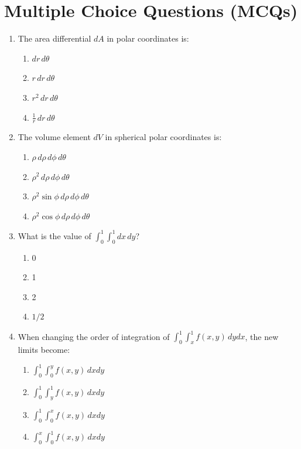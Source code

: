 \section{Multiple Choice Questions (MCQs)}

\begin{enumerate}[leftmargin=1.5em]
    \item The area differential $dA$ in polar coordinates is:
    \begin{enumerate}[label=(\alph*)]
        \item $dr\,d\theta$
        \item $r\,dr\,d\theta$
        \item $r^2\,dr\,d\theta$
        \item $\frac{1}{r}\,dr\,d\theta$
    \end{enumerate}

    \item The volume element $dV$ in spherical polar coordinates is:
    \begin{enumerate}[label=(\alph*)]
        \item $\rho\,d\rho\,d\phi\,d\theta$
        \item $\rho^2\,d\rho\,d\phi\,d\theta$
        \item $\rho^2 \sin\phi\,d\rho\,d\phi\,d\theta$
        \item $\rho^2 \cos\phi\,d\rho\,d\phi\,d\theta$
    \end{enumerate}

    \item What is the value of $\int_0^1 \int_0^1 dx\,dy$?
    \begin{enumerate}[label=(\alph*)]
        \item 0
        \item 1
        \item 2
        \item $1/2$
    \end{enumerate}

    \item When changing the order of integration of $\int_0^1 \int_x^1 f(x,y)\,dy dx$, the new limits become:
    \begin{enumerate}[label=(\alph*)]
        \item $\int_0^1 \int_0^y f(x,y)\,dx dy$
        \item $\int_0^1 \int_y^1 f(x,y)\,dx dy$
        \item $\int_0^1 \int_0^x f(x,y)\,dx dy$
        \item $\int_0^x \int_0^1 f(x,y)\,dx dy$
    \end{enumerate}


\end{enumerate}
